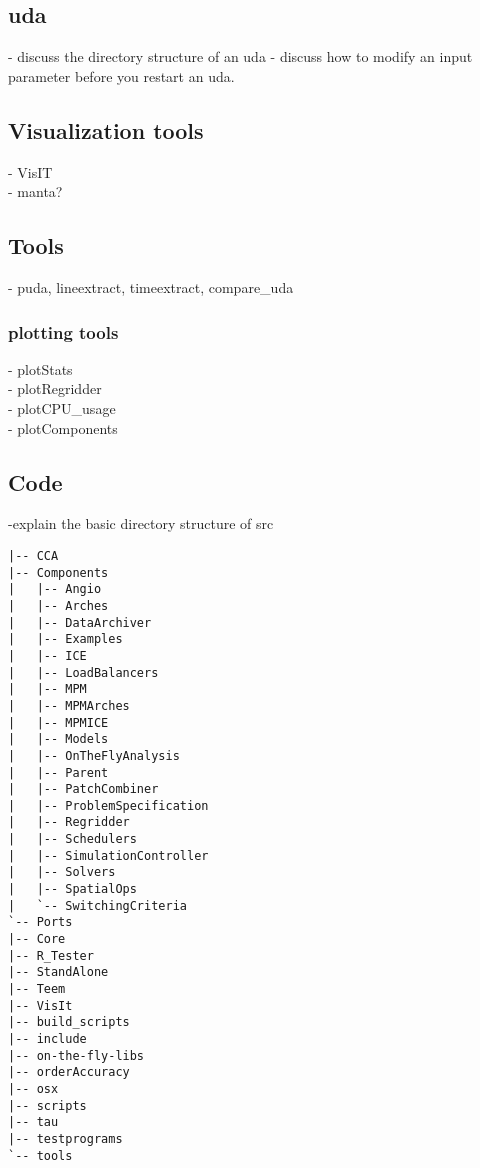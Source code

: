 \subsection{uda}
- discuss the directory structure of an uda
- discuss how to modify an input parameter before you restart an uda.

\subsection{Visualization tools}
- VisIT\\
- manta?

\subsection{Tools}
- puda, lineextract, timeextract, compare\_uda\\

\subsubsection{plotting tools}
- plotStats\\
- plotRegridder \\
- plotCPU\_usage \\
- plotComponents

\subsection{Code}
-explain the basic directory structure of src
\begin{Verbatim}[fontsize=\footnotesize]
|-- CCA
|-- Components
|   |-- Angio
|   |-- Arches
|   |-- DataArchiver
|   |-- Examples
|   |-- ICE
|   |-- LoadBalancers
|   |-- MPM
|   |-- MPMArches
|   |-- MPMICE
|   |-- Models
|   |-- OnTheFlyAnalysis
|   |-- Parent
|   |-- PatchCombiner
|   |-- ProblemSpecification
|   |-- Regridder
|   |-- Schedulers
|   |-- SimulationController
|   |-- Solvers
|   |-- SpatialOps
|   `-- SwitchingCriteria
`-- Ports
|-- Core
|-- R_Tester
|-- StandAlone
|-- Teem
|-- VisIt
|-- build_scripts
|-- include
|-- on-the-fly-libs
|-- orderAccuracy
|-- osx
|-- scripts
|-- tau
|-- testprograms
`-- tools
\end{Verbatim}
